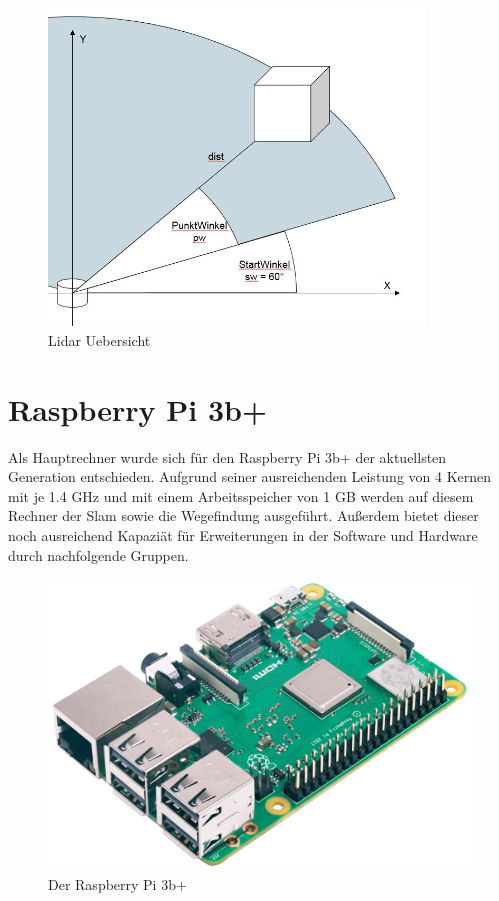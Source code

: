 \begin{figure}[h]
\begin{center}
\includegraphics[width=10cm]{images/chapter5/LidarWinkeluebersicht.JPG}
\caption{Lidar Uebersicht}
\label{Lidar_uebersicht}
\end{center}
\end{figure}

\section{Raspberry Pi 3b+}

Als Hauptrechner wurde sich für den Raspberry Pi 3b+ der aktuellsten Generation entschieden. Aufgrund seiner ausreichenden Leistung von 4 Kernen mit je 1.4 GHz und mit einem Arbeitsspeicher von 1 GB werden auf diesem Rechner der Slam sowie die Wegefindung ausgeführt. Außerdem bietet dieser noch ausreichend Kapaziät für Erweiterungen in der Software und Hardware durch nachfolgende Gruppen.  


\begin{figure}[hbtp]
\centering
\includegraphics[scale=0.1]{images/chapter5/raspberry.png}
\caption{Der Raspberry Pi 3b+ \cite{raspberry.2018}}
\label{fig:raspberry}
\end{figure}






